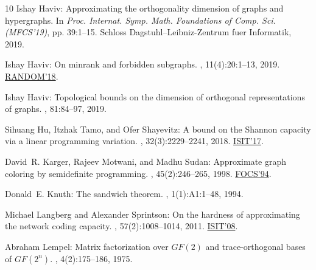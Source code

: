 \documentclass[11pt]{article}
\numberwithin{equation}{section}
\theoremstyle{definition}
\theoremstyle{plain}
\begin{document}
\begin{thebibliography}{10}
{\sc Ishay Haviv}: Approximating the orthogonality dimension of graphs and
  hypergraphs.
\newblock In {\em Proc. Internat. Symp. Math. Foundations of Comp. Sci.
  (MFCS'19)}, pp. 39:1--15. Schloss Dagstuhl--Leibniz-Zentrum fuer Informatik,
  2019.

{\sc Ishay Haviv}: On minrank and forbidden subgraphs.
, 11(4):20:1--13, 2019.
\newblock \prelim
  \href{https:doi.org/10.4230/LIPIcs.APPROX-RANDOM.2018.42}{RANDOM'18}.
\newblock [\epfmtdoi{10.1145/3322817}]

{\sc Ishay Haviv}: Topological bounds on the dimension of orthogonal
  representations of graphs.
, 81:84--97, 2019.

{\sc Sihuang Hu, Itzhak Tamo, and Ofer Shayevitz}: A bound on the {S}hannon
  capacity via a linear programming variation.
, 32(3):2229--2241, 2018.
\newblock \prelim \href{https:doi.org/10.1109/ISIT.2017.8006691}{ISIT'17}.
\newblock [\epfmtdoi{10.1137/17M115565X}]

{\sc David~R. Karger, Rajeev Motwani, and Madhu Sudan}: Approximate graph
  coloring by semidefinite programming.
, 45(2):246--265, 1998.
\newblock \prelim \href{https:doi.org/10.1109/SFCS.1994.365710}{FOCS'94}.
\newblock [\epfmtdoi{10.1145/274787.274791}]

{\sc Donald~E. Knuth}: The sandwich theorem.
, 1(1):A1:1--48, 1994.
\newblock [\epfmtdoi{10.37236/1193}]

{\sc Michael Langberg and Alexander Sprintson}: On the hardness of
  approximating the network coding capacity.
, 57(2):1008--1014, 2011.
\newblock \prelim \href{https:doi.org/10.1109/ISIT.2008.4594999}{ISIT'08}.

{\sc Abraham Lempel}: Matrix factorization over ${GF(2)}$ and trace-orthogonal
  bases of ${GF(2^{n})}$.
, 4(2):175--186, 1975.
\newblock [\epfmtdoi{10.1137/0204014}]


\end{thebibliography}
\end{document}
